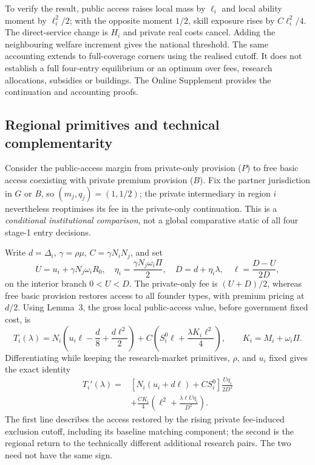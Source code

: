To verify the result, public access raises local mass by $\ell_i$ and local ability moment by $\ell_i^2/2$; with the opposite moment $1/2$, skill exposure rises by $C\ell_i^2/4$.
The direct-service change is $H_i$ and private real costs cancel.
Adding the neighbouring welfare increment gives the national threshold.
The same accounting extends to full-coverage corners using the realised cutoff.
It does not establish a full four-entry equilibrium or an optimum over fees, research allocations, subsidies or buildings.
The Online Supplement provides the continuation and accounting proofs.

\subsection{Regional primitives and technical complementarity}\label{sec:diagnostic}
Consider the public-access margin from private-only provision ($P$) to free basic access coexisting with private premium provision ($B$). Fix the partner jurisdiction in $G$ or $B$, so $(m_j,q_j)=(1,1/2)$; the private intermediary in region $i$ nevertheless reoptimises its fee in the private-only continuation. This is a \emph{conditional institutional comparison}, not a global comparative static of all four stage-1 entry decisions.

Write $d=\Delta_i$, $\gamma=\rho\mu$, $C=\gamma N_iN_j$, and set
\begin{equation}
 U=u_i+\gamma N_j\omega_iR_0,\quad
 \eta_i=\frac{\gamma N_j\omega_i\Pi}{2},\quad
 D=d+\eta_i\lambda,\quad
 \ell=\frac{D-U}{2D},
 \label{eq:screen-primitive}
\end{equation}
on the interior branch $0<U<D$. The private-only fee is $(U+D)/2$, whereas free basic provision restores access to all founder types, with premium pricing at $d/2$.
Using Lemma~3, the gross local public-access value, before government fixed cost, is
\begin{equation}
 T_i(\lambda)=N_i\left(u_i\ell-\frac d8+\frac{d\ell^2}{2}\right)
        +C\left(S_i^0\ell+\frac{\lambda K_i\ell^2}{4}\right),
 \qquad K_i=M_i+\omega_i\Pi .
 \label{eq:screen-threshold}
\end{equation}
Differentiating while keeping the research-market primitives, $\rho$, and $u_i$ fixed gives the exact identity
\begin{equation}
 \begin{split}
 T_i'(\lambda)={}&
 \left[N_i(u_i+d\ell)+CS_i^0\right]
       \frac{U\eta_i}{2D^2}\\
 &+\frac{CK_i}{4}
       \left(\ell^2+\frac{\lambda\ell U\eta_i}{D^2}\right).
 \end{split}
 \label{eq:diagnostic-derivative}
\end{equation}
The first line describes the access restored by the rising private fee-induced exclusion cutoff, including its baseline matching component; the second is the regional return to the technically different additional research pairs. The two need not have the same sign.

